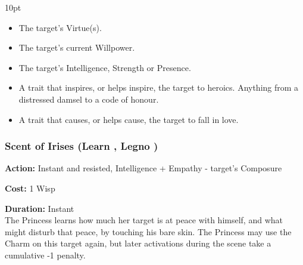 \begin{myindentpar}{10pt}
\begin{itemize}
 \item The target's Virtue(s).
 \item The target's current Willpower.
 \item The target's Intelligence, Strength or Presence.
 \item A trait that inspires, or helps inspire, the target to heroics. Anything from a distressed damsel to a code of honour. 
 \item A trait that causes, or helps cause, the target to fall in love. 
 \end{itemize}\end{myindentpar}

\subsubsection*{Scent of Irises (Learn \textbullet\textbullet, Legno \textbullet)}

\noindent \textbf{Action:} Instant and resisted, Intelligence + Empathy - target's Composure

\noindent \textbf{Cost:} 1 Wisp

\noindent \textbf{Duration:} Instant\\

\noindent The Princess learns how much her target is at peace with himself, and what might disturb that peace, by touching his bare skin. The Princess may use the Charm on this target again, but later activations during the scene take a cumulative -1 penalty.


